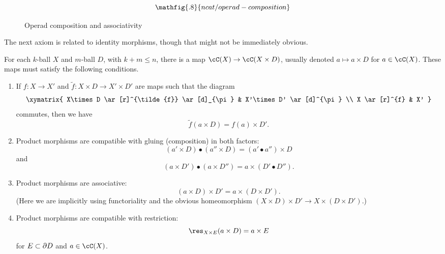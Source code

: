\begin{figure}[!ht]
$$\mathfig{.8}{ncat/operad-composition}$$
\caption{Operad composition and associativity}\label{fig:operad-composition}\end{figure}

The next axiom is related to identity morphisms, though that might not be immediately obvious.

\begin{axiom}
For each $k$-ball $X$ and $m$-ball $D$, with $k+m \le n$, there is a map $\cC(X)\to \cC(X\times D)$, 
usually denoted $a\mapsto a\times D$ for $a\in \cC(X)$.
These maps must satisfy the following conditions.
\begin{enumerate}
\item
If $f:X\to X'$ and $\tilde{f}:X\times D \to X'\times D'$ are maps such that the diagram
\[ \xymatrix{
	X\times D \ar[r]^{\tilde{f}} \ar[d]_{\pi} & X'\times D' \ar[d]^{\pi} \\
	X \ar[r]^{f} & X'
} \]
commutes, then we have 
\[
	\tilde{f}(a\times D) = f(a)\times D' .
\]
\item
Product morphisms are compatible with gluing (composition) in both factors:
\[
	(a'\times D)\bullet(a''\times D) = (a'\bullet a'')\times D
\]
and
\[
	(a\times D')\bullet(a\times D'') = a\times (D'\bullet D'') .
\]
\item
Product morphisms are associative:
\[
	(a\times D)\times D' = a\times (D\times D') .
\]
(Here we are implicitly using functoriality and the obvious homeomorphism
$(X\times D)\times D' \to X\times(D\times D')$.)
\item
Product morphisms are compatible with restriction:
\[
	\res_{X\times E}(a\times D) = a\times E
\]
for $E\subset \partial D$ and $a\in \cC(X)$.
\end{enumerate}
\end{axiom}

